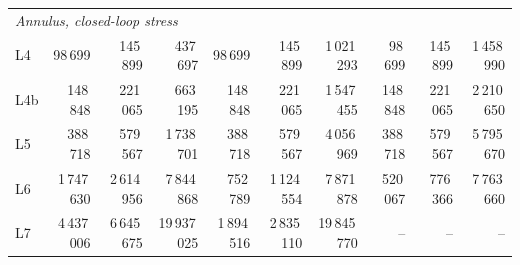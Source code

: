 \begin{tabular}{lrrrrrrrrr}
\midrule
\multicolumn{10}{l}{\emph{Annulus, closed-loop stress}}\\
L4 & 98\,699 & 145\,899 & 437\,697 & 98\,699 & 145\,899 & 1\,021\,293 & 98\,699 & 145\,899 & 1\,458\,990\\
L4b & 148\,848 & 221\,065 & 663\,195 & 148\,848 & 221\,065 & 1\,547\,455 & 148\,848 & 221\,065 & 2\,210\,650\\
L5 & 388\,718 & 579\,567 & 1\,738\,701 & 388\,718 & 579\,567 & 4\,056\,969 & 388\,718 & 579\,567 & 5\,795\,670\\
L6 & 1\,747\,630 & 2\,614\,956 & 7\,844\,868 & 752\,789 & 1\,124\,554 & 7\,871\,878 & 520\,067 & 776\,366 & 7\,763\,660\\
L7 & 4\,437\,006 & 6\,645\,675 & 19\,937\,025 & 1\,894\,516 & 2\,835\,110 & 19\,845\,770 & -- & -- & --\\
\bottomrule
\end{tabular}
